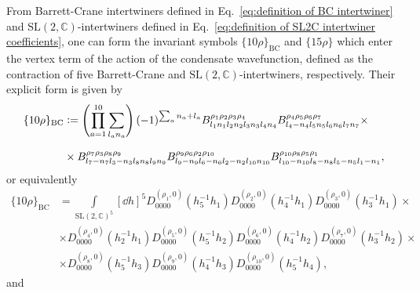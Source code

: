 \documentclass[11pt,a4paper]{article}
\newcommand{\C}{\mathbb C}
\newcommand{\SL}{\text{SL$(2,\C)$}}
\newcommand{\defeq}{\vcentcolon=}
\begin{document}
From Barrett-Crane intertwiners defined in Eq.~\eqref{eq:definition of BC intertwiner} and $\SL$-intertwiners defined in Eq.~\eqref{eq:definition of SL2C intertwiner coefficients}, one can form the invariant symbols $\{10\rho\}_{\text{BC}}$ and $\{15\rho\}$ which enter the vertex term of the action of the condensate wavefunction,  defined as the contraction of five Barrett-Crane and $\SL$-intertwiners, respectively. Their explicit form is given by
%
\begin{equation}\label{eq:definition of BC 10p symbol}
\begin{aligned}
\{10\rho\}_{\text{BC}}
& \defeq
\left(\prod_{a=1}^{10}\sum_{l_a n_a}\right)(-1)^{\sum_a n_a+l_a}B^{\rho_1 \rho_2 \rho_3 \rho_4}_{l_1 n_1 l_2 n_2 l_3 n_3 l_4 n_4}B^{\rho_4 \rho_5 \rho_6 \rho_7}_{l_4 -n_4 l_5 n_5 l_6 n_6 l_7 n_7}\times\\[7pt]
& \times
B^{\rho_7 \rho_3 \rho_8 \rho_9}_{l_7 -n_7 l_3 -n_3 l_8 n_8 l_9 n_9}B^{\rho_9 \rho_6 \rho_2 \rho_{10}}_{l_9 -n_9 l_6 -n_6 l_2 -n_2 l_{10} n_{10}}B^{\rho_{10} \rho_8 \rho_5 \rho_1}_{l_{10} -n_{10} l_8 -n_8 l_5 -n_5 l_1 -n_1},
\end{aligned}
\end{equation}
%
or equivalently
%
\begin{equation}\label{eq:integral form of 10p}
\begin{aligned}
\{10\rho\}_{\text{BC}}
& =
\int\limits_{\SL^5}\left[\dd{h}\right]^5D^{(\rho_1,0)}_{0000}(h_5^{-1}h_1)D^{(\rho_2,0)}_{0000}(h_4^{-1}h_1)D^{(\rho_3,0)}_{0000}(h_3^{-1}h_1)\times\\[7pt]
& \times D^{(\rho_4,0)}_{0000}(h_2^{-1}h_1)D^{(\rho_5,0)}_{0000}(h_5^{-1}h_2)D^{(\rho_6,0)}_{0000}(h_4^{-1}h_2)D^{(\rho_7,0)}_{0000}(h_3^{-1}h_2)\times\\[7pt]
& \times
D^{(\rho_8,0)}_{0000}(h_5^{-1}h_3)D^{(\rho_9,0)}_{0000}(h_4^{-1}h_3)D^{(\rho_{10},0)}_{0000}(h_5^{-1}h_4),
\end{aligned}
\end{equation}
%
and 
%
\end{document}
